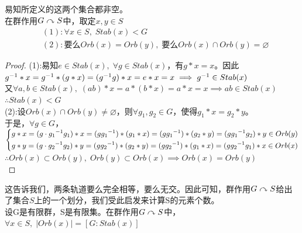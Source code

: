 易知所定义的这两个集合都非空。\\
在群作用$G\curvearrowright S$中，取定$x,y\in S$\\
\begin{align*}
&(1):\forall x\in S,\; Stab(x)<G\\
&(2):\text{要么}Orb(x)=Orb(y),\;\text{要么}Orb(x)\cap Orb(y)=\varnothing
\end{align*}
\begin{proof}
(1):易知$e\in Stab(x),\; \forall g\in Stab(x)$，有$g*x=x$。因此${g}^{-1}*x={g}^{-1}*(g*x)=({g}^{-1}g)*x=e*x=x\implies {g}^{-1}\in Stab(x)$\\
又$\forall a,b\in Stab(x),\; (ab)*x=a*(b*x)=a*x=x\implies ab\in Stab(x)$\\
$\therefore Stab(x)<G$\\
(2):设$Orb(x)\cap Orb(y)\neq \varnothing$，则$\forall g_1,g_2\in G$，使得$g_1*x=g_2*y$。\\
于是，$\forall g\in G$，$\left\{
\begin{aligned}
&g*x=(g\cdot {g_1}^{-1}g_1)*x=(g{g_1}^{-1})*(g_1*x)=(g{g_1}^{-1})*(g_2*y)=(g{g_1}^{-1}g_2)*y\in Orb(y)\\
&g*y=(g\cdot {g_2}^{-1}g_2)*y=(g{g_2}^{-1})*(g_2*y)=(g{g_2}^{-1})*(g_1*x)=(g{g_2}^{-1}g_1)*x\in Orb(x)
\end{aligned}\right.$\\
$\therefore Orb(x)\subset Orb(y),\; Orb(y)\subset Orb(x)\implies Orb(x)=Orb(y)$\\
\end{proof}
这告诉我们，两条轨道要么完全相等，要么无交。因此可知，群作用$G\curvearrowright S$给出了集合$S$上的一个划分，我们受此启发来计算S的元素个数。\\
设G是有限群，S是有限集。在群作用$G\curvearrowright S$中，$\forall x\in S,\; |Orb(x)|=[G:Stab(x)]$
